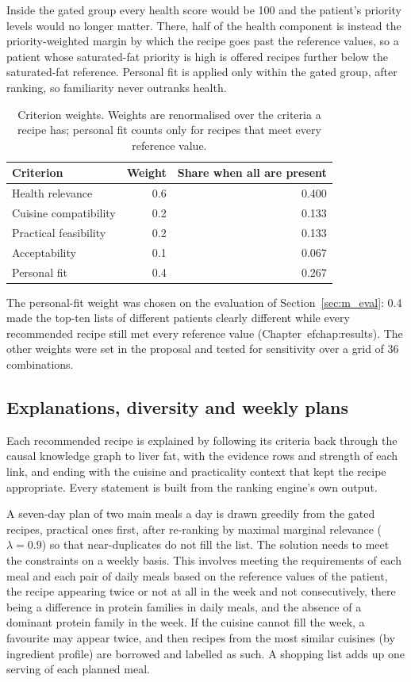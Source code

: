Inside the gated group every health score would be 100 and the patient's
priority levels would no longer matter. There, half of the health component
is instead the priority-weighted margin by which the recipe goes past the
reference values, so a patient whose saturated-fat priority is high is
offered recipes further below the saturated-fat reference. Personal fit is
applied only within the gated group, after ranking, so familiarity never
outranks health.

\begin{table}[htbp]
\centering
\caption{Criterion weights. Weights are renormalised over the criteria a recipe has; personal fit counts only for recipes that meet every reference value.}
\label{tab:m_weights}
\begin{tabular}{lrr}
\toprule
Criterion & Weight & Share when all are present \\
\midrule
Health relevance & 0.6 & 0.400 \\
Cuisine compatibility & 0.2 & 0.133 \\
Practical feasibility & 0.2 & 0.133 \\
Acceptability & 0.1 & 0.067 \\
Personal fit & 0.4 & 0.267 \\
\bottomrule
\end{tabular}
\end{table}

The personal-fit weight was chosen on the evaluation of
Section~\ref{sec:m_eval}: 0.4 made the top-ten lists of different patients
clearly different while every recommended recipe still met every reference
value (Chapter~ef{chap:results}). The other weights were set in the proposal and tested for
sensitivity over a grid of 36 combinations.

\subsection{Explanations, diversity and weekly plans}

Each recommended recipe is explained by following its criteria back through
the causal knowledge graph to liver fat, with the evidence rows and strength
of each link, and ending with the cuisine and practicality context that kept
the recipe appropriate. Every statement is built from the ranking engine's
own output.

A seven-day plan of two main meals a day is drawn greedily from the gated
recipes, practical ones first, after re-ranking by maximal marginal relevance
\cite{carbonell1998mmr} ($\lambda = 0.9$) so that near-duplicates do not fill
the list. The solution needs to meet the constraints on a weekly basis. This involves 
meeting the requirements of each meal and each pair of daily meals based on the reference 
values of the patient, the recipe appearing twice or not at all in the week and not consecutively, 
there being a difference in protein families in daily meals, 
and the absence of a dominant protein family in the week. If the cuisine
cannot fill the week, a favourite may appear twice, and then recipes from the
most similar cuisines (by ingredient profile) are borrowed and labelled as
such. A shopping list adds up one serving of each planned meal.

